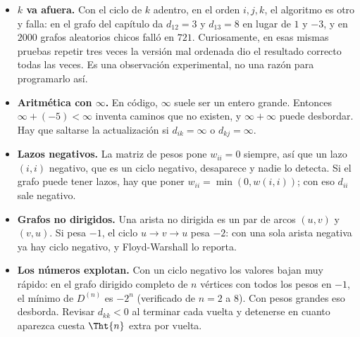\documentclass[11pt,letterpaper]{article}
\begin{document}
\begin{ojo}[breakable]
  \begin{itemize}[itemsep=0.2em, leftmargin=1.2em]
    \item \textbf{$k$ va afuera.} Con el ciclo de $k$ adentro, en el
          orden $i, j, k$, el algoritmo es otro y falla: en el grafo
          del capítulo da $d_{12} = 3$ y $d_{13} = 8$ en lugar de $1$
          y $-3$, y en $2000$ grafos aleatorios chicos falló en $721$.
          Curiosamente, en esas mismas pruebas repetir tres veces la
          versión mal ordenada dio el resultado correcto todas las
          veces. Es una observación experimental, no una razón para
          programarlo así.
    \item \textbf{Aritmética con $\infty$.} En código, $\infty$ suele
          ser un entero grande. Entonces $\infty + (-5) < \infty$
          inventa caminos que no existen, y $\infty + \infty$ puede
          desbordar. Hay que saltarse la actualización si
          $d_{ik} = \infty$ o $d_{kj} = \infty$.
    \item \textbf{Lazos negativos.} La matriz de pesos pone
          $w_{ii} = 0$ siempre, así que un lazo $(i, i)$ negativo, que
          es un ciclo negativo, desaparece y nadie lo detecta. Si el
          grafo puede tener lazos, hay que poner
          $w_{ii} = \min(0, w(i, i))$; con eso $d_{ii}$ sale negativo.
    \item \textbf{Grafos no dirigidos.} Una arista no dirigida es un
          par de arcos $(u, v)$ y $(v, u)$. Si pesa $-1$, el ciclo
          $u \to v \to u$ pesa $-2$: con una sola arista negativa ya
          hay ciclo negativo, y Floyd-Warshall lo reporta.
    \item \textbf{Los números explotan.} Con un ciclo negativo los
          valores bajan muy rápido: en el grafo dirigido completo de
          $n$ vértices con todos los pesos en $-1$, el mínimo de
          $D^{(n)}$ es $-2^n$ (verificado de $n = 2$ a $8$). Con pesos
          grandes eso desborda. Revisar $d_{kk} < 0$ al terminar cada
          vuelta y detenerse en cuanto aparezca cuesta $\Tht{n}$ extra
          por vuelta.
  \end{itemize}
\end{ojo}
\end{document}
